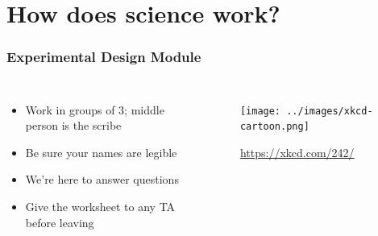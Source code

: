 
\section{How does science work?}

\begin{noheadline}
\begin{frame}
    \frametitle{Experimental Design Module}

    \begin{columns}


        \vspace{-1cm}
        \begin{minipage}[c][\textheight][c]{\linewidth}
        \begin{itemize}
            \item Work in groups of 3; middle person is the scribe
            \item Be sure your names are legible
            \item We're here to answer questions
            \item Give the worksheet to any TA before leaving
        \end{itemize}
        \end{minipage}


        \vspace{-1cm}
        \begin{figure}
            \begin{center}
            \texttt{[image: ../images/xkcd-cartoon.png]}
            \caption{\tiny \href{https://xkcd.com/242/}{https://xkcd.com/242/}}
            \end{center}
        \end{figure}
    \end{columns}
\end{frame}
\end{noheadline}




